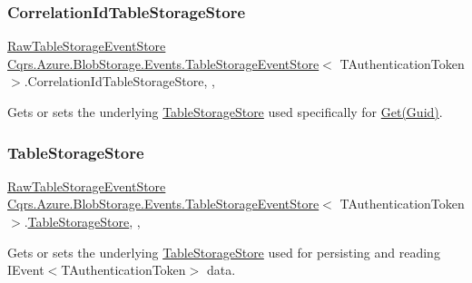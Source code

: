 \subsubsection{\texorpdfstring{Correlation\+Id\+Table\+Storage\+Store}{CorrelationIdTableStorageStore}}
{\footnotesize\ttfamily \hyperlink{classCqrs_1_1Azure_1_1BlobStorage_1_1Events_1_1TableStorageEventStore_1_1RawTableStorageEventStore}{Raw\+Table\+Storage\+Event\+Store} \hyperlink{classCqrs_1_1Azure_1_1BlobStorage_1_1Events_1_1TableStorageEventStore}{Cqrs.\+Azure.\+Blob\+Storage.\+Events.\+Table\+Storage\+Event\+Store}$<$ T\+Authentication\+Token $>$.Correlation\+Id\+Table\+Storage\+Store\hspace{0.3cm}{\ttfamily [get]}, {\ttfamily [set]}, {\ttfamily [protected]}}



Gets or sets the underlying \hyperlink{classCqrs_1_1Azure_1_1BlobStorage_1_1TableStorageStore}{Table\+Storage\+Store} used specifically for \hyperlink{classCqrs_1_1Azure_1_1BlobStorage_1_1Events_1_1TableStorageEventStore_a9b952a9257dc6f458b98eba87684412e_a9b952a9257dc6f458b98eba87684412e}{Get(\+Guid)}. 

\mbox{\label{classCqrs_1_1Azure_1_1BlobStorage_1_1Events_1_1TableStorageEventStore_ad86c24c28321c16b1f3601b3e7d870c4_ad86c24c28321c16b1f3601b3e7d870c4}} 
\subsubsection{\texorpdfstring{Table\+Storage\+Store}{TableStorageStore}}
{\footnotesize\ttfamily \hyperlink{classCqrs_1_1Azure_1_1BlobStorage_1_1Events_1_1TableStorageEventStore_1_1RawTableStorageEventStore}{Raw\+Table\+Storage\+Event\+Store} \hyperlink{classCqrs_1_1Azure_1_1BlobStorage_1_1Events_1_1TableStorageEventStore}{Cqrs.\+Azure.\+Blob\+Storage.\+Events.\+Table\+Storage\+Event\+Store}$<$ T\+Authentication\+Token $>$.\hyperlink{classCqrs_1_1Azure_1_1BlobStorage_1_1TableStorageStore}{Table\+Storage\+Store}\hspace{0.3cm}{\ttfamily [get]}, {\ttfamily [set]}, {\ttfamily [protected]}}



Gets or sets the underlying \hyperlink{classCqrs_1_1Azure_1_1BlobStorage_1_1TableStorageStore}{Table\+Storage\+Store} used for persisting and reading I\+Event$<$\+T\+Authentication\+Token$>$ data. 

